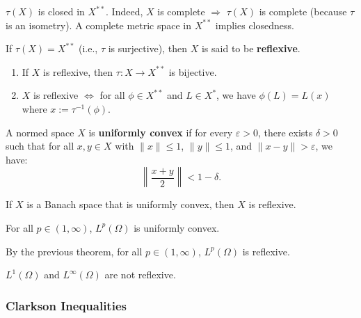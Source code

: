 \begin{remark}
$\tau(X)$ is closed in $X^{**}$. Indeed, $X$ is complete $\Rightarrow$ $\tau(X)$ is complete (because $\tau$ is an isometry). A complete metric space in $X^{**}$ implies closedness.
\end{remark}

\begin{definition}
If $\tau(X) = X^{**}$ (i.e., $\tau$ is surjective), then $X$ is said to be \textbf{reflexive}.
\end{definition}

\begin{remark}
\begin{enumerate}
\item If $X$ is reflexive, then $\tau : X \to X^{**}$ is bijective.
\item $X$ is reflexive $\Leftrightarrow$ for all $\phi \in X^{**}$ and $L \in X^*$, we have $\phi(L) = L(x)$ where $x := \tau^{-1}(\phi)$.
\end{enumerate}
\end{remark}

\begin{definition}
A normed space $X$ is \textbf{uniformly convex} if for every $\varepsilon > 0$, there exists $\delta > 0$ such that for all $x, y \in X$ with $\|x\| \leq 1$, $\|y\| \leq 1$, and $\|x - y\| > \varepsilon$, we have:
\[
\left\| \frac{x + y}{2} \right\| < 1 - \delta.
\]
\end{definition}

\begin{theorem}
If $X$ is a Banach space that is uniformly convex, then $X$ is reflexive.
\end{theorem}

\begin{theorem}
For all $p \in (1, \infty)$, $L^p(\Omega)$ is uniformly convex.
\end{theorem}

\begin{corollary}
By the previous theorem, for all $p \in (1, \infty)$, $L^p(\Omega)$ is reflexive.
\end{corollary}

\begin{remark}
$L^1(\Omega)$ and $L^\infty(\Omega)$ are not reflexive.
\end{remark}

\subsubsection{Clarkson Inequalities}

